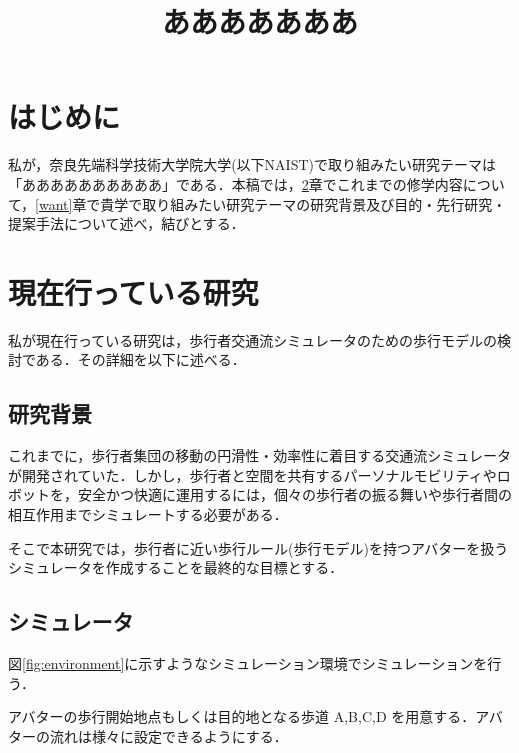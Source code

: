 \documentclass[twocolumn]{jarticle}%
\title{\vspace{5mm}\large{あああああああ}\vspace{-15mm}}
\date{}
\begin{document}
\normalsize
\maketitle

\section{はじめに}
\thispagestyle{fancy}

私が，奈良先端科学技術大学院大学(以下NAIST)で取り組みたい研究テーマは「ああああああああああ」である．本稿では，\ref{current}章でこれまでの修学内容について，\ref{want}章で貴学で取り組みたい研究テーマの研究背景及び目的・先行研究・提案手法について述べ，結びとする．

\section{現在行っている研究}\label{current}
私が現在行っている研究は，歩行者交通流シミュレータのための歩行モデルの検討である．その詳細を以下に述べる．

\subsection{研究背景}
これまでに，歩行者集団の移動の円滑性・効率性に着目する交通流シミュレータが開発されていた．しかし，歩行者と空間を共有するパーソナルモビリティやロボットを，安全かつ快適に運用するには，個々の歩行者の振る舞いや歩行者間の相互作用までシミュレートする必要がある．

そこで本研究では，歩行者に近い歩行ルール(歩行モデル)を持つアバターを扱うシミュレータを作成することを最終的な目標とする．


\subsection{シミュレータ}
図\ref{fig:environment}に示すようなシミュレーション環境でシミュレーションを行う．

アバターの歩行開始地点もしくは目的地となる歩道 A,B,C,D を用意する．アバターの流れは様々に設定できるようにする．
\end{document}
